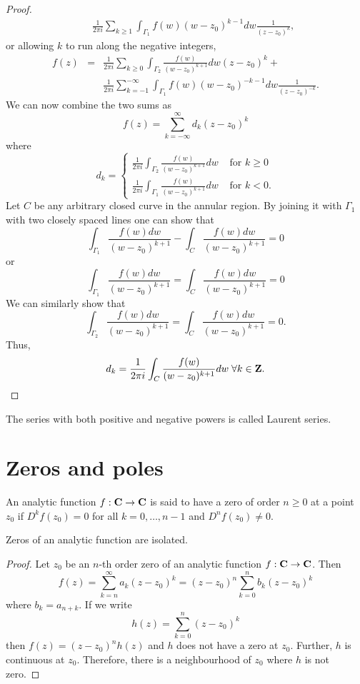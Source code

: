 \begin{proof}
\begin{eqnarray*}
 & & \frac{1}{2\pi i}
\sum_{k \ge 1}\int_{\Gamma_1}f(w)(w - z_0)^{k-1}dw \frac{1}{(z - z_0)^{k}},
\end{eqnarray*}
or allowing $k$ to run along the negative integers,
\begin{eqnarray*}
f(z) &=& \frac{1}{2\pi i}
\sum_{k \ge 0}\int_{\Gamma_2}\frac{f(w)}{(w - z_0)^{k+1}}dw (z-z_0)^k + \\
 & & \frac{1}{2\pi i}
 \sum_{k=-1}^{-\infty}\int_{\Gamma_1}f(w)(w - z_0)^{-k-1}dw 
\frac{1}{(z - z_0)^{-k}}.
\end{eqnarray*}
We can now combine the two sums as
\[
f(z) = \sum_{k=-\infty}^\infty d_k (z - z_0)^k
\]
where
\[
d_k = \begin{cases}
\frac{1}{2\pi i}
\int_{\Gamma_2}\frac{f(w)}{(w - z_0)^{k+1}}dw & \text{ for } k \ge 0 \\
\frac{1}{2\pi i}
\int_{\Gamma_1}\frac{f(w)}{(w - z_0)^{k+1}}dw & \text{ for } k < 0 .
\end{cases}
\]
Let $C$ be any arbitrary closed curve in the annular region. By joining it
with $\Gamma_1$ with two closely spaced lines one can show that
\[
\int_{\Gamma_1}\frac{f(w)dw}{(w - z_0)^{k+1}} - 
\int_C\frac{f(w)dw}{(w - z_0)^{k+1}} = 0
\]
or 
\[
\int_{\Gamma_1}\frac{f(w)dw}{(w - z_0)^{k+1}} = 
\int_C\frac{f(w)dw}{(w - z_0)^{k+1}} = 0
\]
We can similarly show that
\[
\int_{\Gamma_2}\frac{f(w)dw}{(w - z_0)^{k+1}} = 
\int_C\frac{f(w)dw}{(w - z_0)^{k+1}} = 0.
\]
Thus,
\[
d_k = \frac{1}{2\pi i}\int_C \frac{f(w)}{(w - z_0)^{k + 1}}dw \;\forall k \in
\mathbf{Z}.
\]
\end{proof}
\begin{rem}
The series with both positive and negative powers is called Laurent series.
\end{rem}

\section{Zeros and poles}\label{c5s2}
\begin{defn}\label{c5s2d1}
An analytic function $f: \mathbf{C} \rightarrow \mathbf{C}$ is said to have a zero of
order $n \ge 0$ at a point $z_0$ if $D^kf(z_0) = 0$ for all $k = 0, \ldots,
n - 1$ and $D^nf(z_0) \ne 0$.
\end{defn}

\begin{thm}\label{c5s2t1}
Zeros of an analytic function are isolated.
\end{thm}
\begin{proof}
Let $z_0$ be an $n$-th order zero of an analytic function $f:\mathbf{C} \rightarrow
\mathbf{C}$. Then
\[
f(z) = \sum_{k=n}^\infty a_k(z - z_0)^k = (z - z_0)^n \sum_{k=0}^n b_k(z-z_0)^k
\]
where $b_k = a_{n+k}$. If we write 
\[
h(z) = \sum_{k=0}^n(z - z_0)^k
\]
then $f(z) = (z - z_0)^n h(z)$ and $h$ does not have a zero at $z_0$. Further,
$h$ is continuous at $z_0$. Therefore, there is a neighbourhood of $z_0$ where
$h$ is not zero.
\end{proof}

